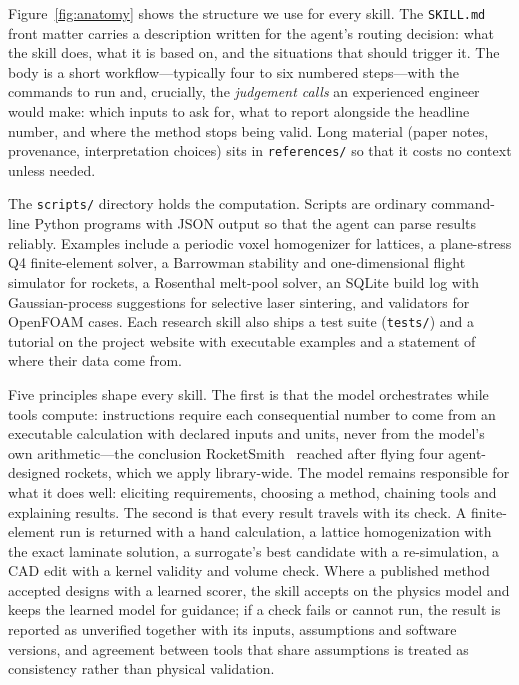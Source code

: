 \documentclass[11pt]{article}
\begin{document}
Figure~\ref{fig:anatomy} shows the structure we use for every skill. The \texttt{SKILL.md}
front matter carries a description written for the agent's routing decision: what the skill does,
what it is based on, and the situations that should trigger it. The body is a short
workflow---typically four to six numbered steps---with the commands to run and, crucially, the
\emph{judgement calls} an experienced engineer would make: which inputs to ask for, what to report
alongside the headline number, and where the method stops being valid. Long material (paper
notes, provenance, interpretation choices) sits in \texttt{references/} so that it costs no
context unless needed.

The \texttt{scripts/} directory holds the computation. Scripts are ordinary command-line Python
programs with JSON output so that the agent can parse results reliably. Examples include a
periodic voxel homogenizer for lattices, a plane-stress Q4 finite-element solver, a Barrowman
stability and one-dimensional flight simulator for rockets, a Rosenthal melt-pool solver, an
SQLite build log with Gaussian-process suggestions for selective laser sintering, and validators
for OpenFOAM cases. Each research skill also ships a test suite (\texttt{tests/}) and a tutorial
on the project website with executable examples and a statement of where their data come from.

Five principles shape every skill. The first is that the model orchestrates while tools compute:
instructions require each consequential number to come from an executable calculation with declared
inputs and units, never from the model's own arithmetic---the conclusion RocketSmith~\cite{pak2026rocketsmith}
reached after flying four agent-designed rockets, which we apply library-wide. The model remains
responsible for what it does well: eliciting requirements, choosing a method, chaining tools and
explaining results. The second is that every result travels with its check. A finite-element run is
returned with a hand calculation, a lattice homogenization with the exact laminate solution, a
surrogate's best candidate with a re-simulation, a CAD edit with a kernel validity and volume check.
Where a published method accepted designs with a learned scorer, the skill accepts on the physics
model and keeps the learned model for guidance; if a check fails or cannot run, the result is reported
as unverified together with its inputs, assumptions and software versions, and agreement between
tools that share assumptions is treated as consistency rather than physical validation.
\end{document}
